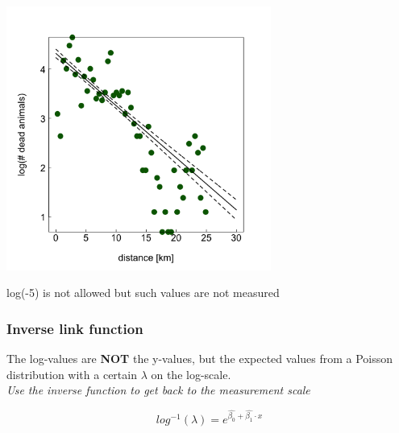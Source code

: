 \documentclass{beamer}
\begin{document}
\begin{frame}
    \frametitle{}
    \begin{center}
    \includegraphics[width=0.65\textwidth]{lectures/day_9_refreshing_glm/figures/unnamed-chunk-24-1.png}
    \vspace{0.3cm}
    
    \large
    log(-5) is not allowed but such values are not measured 
    \end{center}
\end{frame}

\begin{frame}
    \frametitle{Inverse link function}
    \large
    The log-values are \textbf{NOT} the y-values, but the expected values from a Poisson distribution with a certain $\lambda$ on the log-scale.\\
    \textit{Use the inverse function to get back to the measurement scale}

    \[
    log^{-1}(\lambda) = e^{\hat{\beta_0} + \hat{\beta_1} \cdot x}
    \]
\end{frame}
\end{document}

